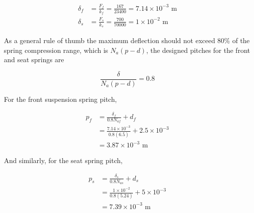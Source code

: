 \documentclass[
10pt,
a4paper,
openany,
svgnames,
]{book}
\begin{document}
\begin{solution}
  \begin{align*}
    \delta_f &= \frac{F_f}{k_f} = \frac{167}{23400} = 7.14 \times 10^{-3} \text{ m} \\
    \delta_s &= \frac{F_s}{k_s} = \frac{700}{70000} = 1 \times 10^{-2}\text{ m}
  \end{align*}

  As a general rule of thumb the maximum deflection should not exceed 80\% of the spring compression range, which is $N_a(p - d)$, the designed pitches for the front and seat springs are

  \[\frac{\delta}{N_a(p - d)} = 0.8\]

  For the front suspension spring pitch,

  \begin{align*}
    p_f &= \frac{\delta _f}{0.8N_{af}} + d_f \\ 
          &= \frac{7.14 \times 10^{-3}}{0.8(6.5)} + 2.5 \times 10^{-3} \\ 
          &= 3.87 \times 10^{-3} \text{ m}
  \end{align*}

  And similarly, for the seat spring pitch,

  \begin{align*}
    p_s &= \frac{\delta _s}{0.8N_{as}} + d_s \\ 
          &= \frac{1 \times 10^{-2}}{0.8(5.24)} + 5 \times 10^{-3} \\ 
          &= 7.39 \times 10^{-3}\text{ m}
  \end{align*}
\end{solution}
\end{document}

